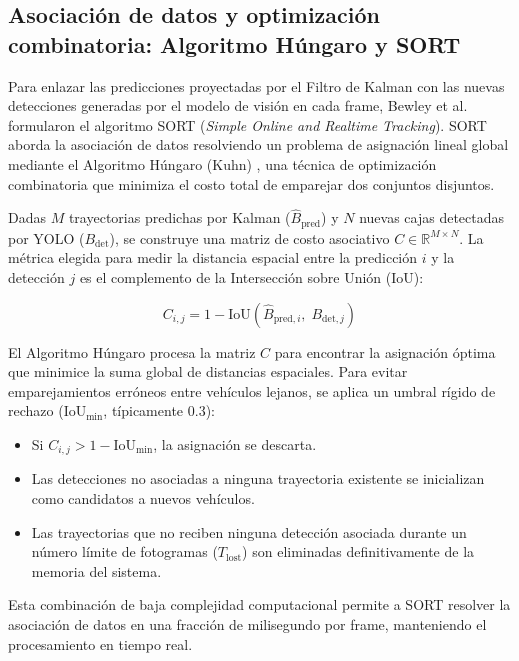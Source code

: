 \subsection{Asociación de datos y optimización combinatoria: Algoritmo Húngaro y SORT}

Para enlazar las predicciones proyectadas por el Filtro de Kalman con las nuevas
detecciones generadas por el modelo de visión en cada frame, Bewley et al.
\cite{bewley2016sort} formularon el algoritmo SORT (\textit{Simple Online and
Realtime Tracking}). SORT aborda la asociación de datos resolviendo un problema
de asignación lineal global mediante el Algoritmo Húngaro (Kuhn)
\cite{kuhn1955hungarian}, una técnica de
optimización combinatoria que minimiza el costo total de emparejar dos conjuntos
disjuntos.

Dadas $M$ trayectorias predichas por Kalman ($\hat{B}_{\text{pred}}$) y $N$
nuevas cajas detectadas por YOLO ($B_{\text{det}}$), se construye una matriz de
costo asociativo $C \in \mathbb{R}^{M \times N}$. La métrica elegida para medir
la distancia espacial entre la predicción $i$ y la detección $j$ es el
complemento de la Intersección sobre Unión (IoU):

\begin{equation}
C_{i,j} = 1 - \text{IoU}\left(\hat{B}_{\text{pred}, i}, \; B_{\text{det}, j}\right)
\end{equation}

El Algoritmo Húngaro procesa la matriz $C$ para encontrar la asignación óptima
que minimice la suma global de distancias espaciales. Para evitar
emparejamientos erróneos entre vehículos lejanos, se aplica un umbral rígido de
rechazo ($\text{IoU}_{\text{min}}$, típicamente $0{.}3$):

\begin{itemize}
    \item Si $C_{i,j} > 1 - \text{IoU}_{\text{min}}$, la asignación se descarta.
    \item Las detecciones no asociadas a ninguna trayectoria existente se
        inicializan como candidatos a nuevos vehículos.
    \item Las trayectorias que no reciben ninguna detección asociada durante un
        número límite de fotogramas ($T_{\text{lost}}$) son eliminadas
        definitivamente de la memoria del sistema.
\end{itemize}

Esta combinación de baja complejidad computacional permite a SORT resolver la
asociación de datos en una fracción de milisegundo por frame, manteniendo el
procesamiento en tiempo real.

